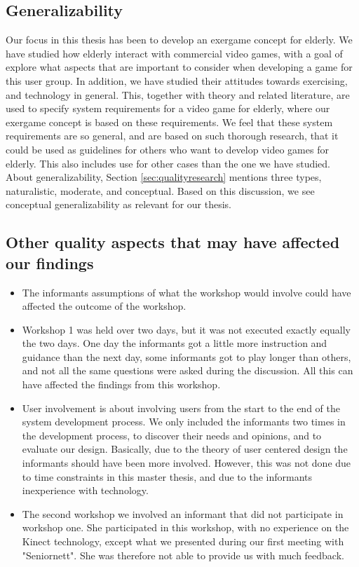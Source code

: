 \subsection{Generalizability}    
Our focus in this thesis has been to develop an exergame concept for elderly. We have studied how elderly interact with commercial video games, with a goal of explore what aspects that are important to consider when developing a game for this user group. In addition, we have studied their attitudes towards exercising, and technology in general. This, together with theory and related literature, are used to specify system requirements for a video game for elderly, where our exergame concept is based on these requirements. We feel that these system requirements are so general, and are based on such thorough research, that it could be used as guidelines for others who want to develop video games for elderly. This also includes use for other cases than the one we have studied. About generalizability, Section \ref{sec:qualityresearch} mentions three types, naturalistic, moderate, and conceptual. Based on this discussion, we see conceptual generalizability as relevant for our thesis.    


\subsection{Other quality aspects that may have affected our findings}
\begin{itemize}
\renewcommand{\labelitemi}{$\bullet$}
\item The informants assumptions of what the workshop would involve could have affected the outcome of the workshop. 
\item Workshop 1 was held over two days, but it was not executed exactly equally the two days. One day the informants got a little more instruction and guidance than the next day, some informants got to play longer than others, and not all the same questions were asked during the discussion. All this can have affected the findings from this workshop. 
\item User involvement is about involving users from the start to the end of the system development process. We only included the informants two times in the development process, to discover their needs and opinions, and to evaluate our design. Basically, due to the theory of user centered design the informants should have been more involved. However, this was not done due to time constraints in this master thesis, and due to the informants inexperience with technology. 
\item The second workshop we involved an informant that did not participate in workshop one. She participated in this workshop, with no experience on the Kinect technology, except what we presented during our first meeting with "Seniornett". She was therefore not able to provide us with much feedback.
\end{itemize}

